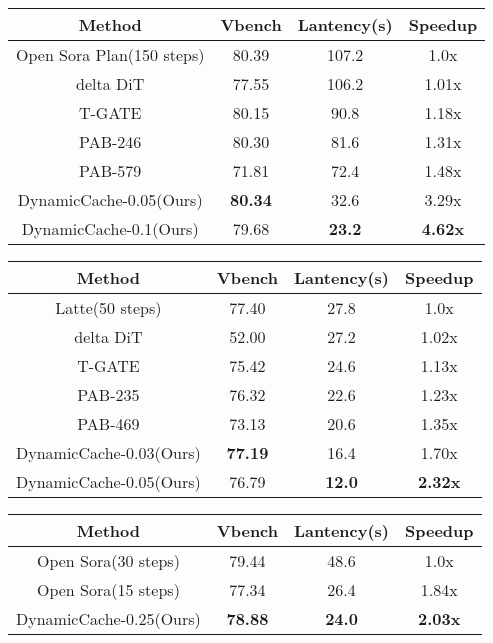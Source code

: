 \documentclass{article}
\begin{document}
\begin{table}[]
\begin{tabular}{cccc}
\toprule
Method                    & Vbench         & Lantency(s)   & Speedup        \\
\midrule
Open Sora Plan(150 steps) & 80.39          & 107.2         & 1.0x           \\
\midrule
delta DiT                 & 77.55          & 106.2         & 1.01x          \\
T-GATE                    & 80.15          & 90.8          & 1.18x          \\
PAB-246                   & 80.30          & 81.6          & 1.31x          \\
PAB-579                   & 71.81          & 72.4          & 1.48x          \\
\midrule
DynamicCache-0.05(Ours)          & \textbf{80.34} & 32.6          & 3.29x          \\
DynamicCache-0.1(Ours)           & 79.68          & \textbf{23.2} & \textbf{4.62x}\\
\bottomrule
\end{tabular}
\end{table}



\begin{table}[]
\begin{tabular}{cccc}
\toprule
Method           & Vbench         & Lantency(s) & Speedup        \\
\midrule
Latte(50 steps)  & 77.40          & 27.8        & 1.0x           \\
\midrule
delta DiT        & 52.00          & 27.2        & 1.02x          \\
T-GATE           & 75.42          & 24.6        & 1.13x          \\
PAB-235          & 76.32          & 22.6        & 1.23x          \\
PAB-469          & 73.13          & 20.6        & 1.35x          \\
\midrule
DynamicCache-0.03(Ours) & \textbf{77.19} & 16.4        & 1.70x          \\
DynamicCache-0.05(Ours) & 76.79          & \textbf{12.0}        & \textbf{2.32x} \\
\bottomrule
\end{tabular}
\end{table}


\begin{table}[]
\begin{tabular}{cccc}
\toprule
Method              & Vbench         & Lantency(s)   & Speedup        \\
\midrule
Open Sora(30 steps) & 79.44          & 48.6          & 1.0x           \\
Open Sora(15 steps) & 77.34          & 26.4          & 1.84x          \\
DynamicCache-0.25(Ours)    & \textbf{78.88} & \textbf{24.0} & \textbf{2.03x} \\
\bottomrule
\end{tabular}
\end{table}
\end{document}

